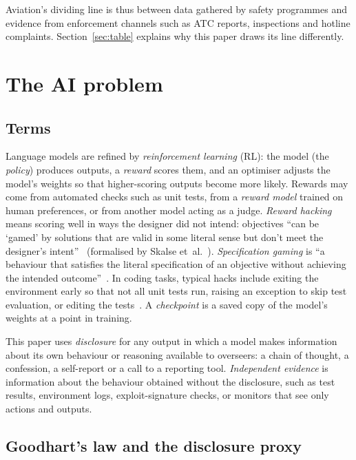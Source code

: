 \documentclass[11pt]{article}
\begin{document}
Aviation's dividing line is thus between data gathered by safety programmes and evidence from enforcement channels such as ATC reports, inspections and hotline complaints. Section~\ref{sec:table} explains why this paper draws its line differently.

\section{The AI problem}\label{sec:ai}

\subsection{Terms}\label{sec:terms}

Language models are refined by \emph{reinforcement learning} (RL): the model (the \emph{policy}) produces outputs, a \emph{reward} scores them, and an optimiser adjusts the model's weights so that higher-scoring outputs become more likely. Rewards may come from automated checks such as unit tests, from a \emph{reward model} trained on human preferences, or from another model acting as a judge. \emph{Reward hacking} means scoring well in ways the designer did not intend: objectives ``can be `gamed' by solutions that are valid in some literal sense but don't meet the designer's intent''~\cite[Sec.~4]{amodei2016} (formalised by Skalse et~al.~\cite{skalse2022}). \emph{Specification gaming} is ``a behaviour that satisfies the literal specification of an objective without achieving the intended outcome''~\cite{krakovna2020}. In coding tasks, typical hacks include exiting the environment early so that not all unit tests run, raising an exception to skip test evaluation, or editing the tests~\cite[Secs.~2.1, 3.1]{baker2025}. A \emph{checkpoint} is a saved copy of the model's weights at a point in training.

This paper uses \emph{disclosure} for any output in which a model makes information about its own behaviour or reasoning available to overseers: a chain of thought, a confession, a self-report or a call to a reporting tool. \emph{Independent evidence} is information about the behaviour obtained without the disclosure, such as test results, environment logs, exploit-signature checks, or monitors that see only actions and outputs.

\subsection{Goodhart's law and the disclosure proxy}\label{sec:goodhart}
\end{document}
